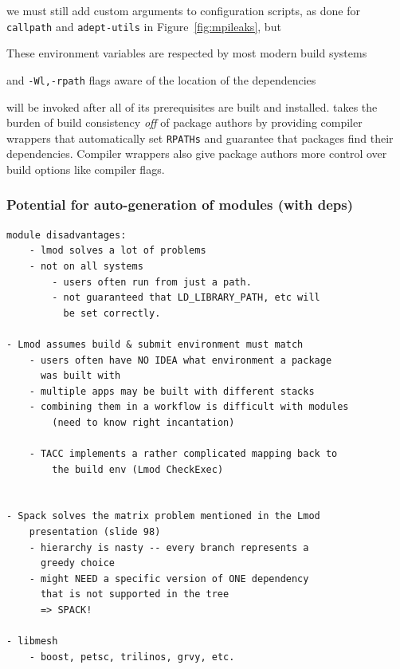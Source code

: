 we must still add custom arguments to configuration scripts, as done for
{\tt callpath} and {\tt adept-utils} in Figure~\ref{fig:mpileaks}, but 

These environment
variables are respected by most modern build systems


 and {\tt -Wl,-rpath} flags 
aware of the location of the dependencies 



 will be invoked
after all of its prerequisites are built and installed.  takes the burden of
build consistency {\it off} of package authors by providing compiler 
wrappers that automatically set {\tt RPATHs} and guarantee that packages
find their dependencies.  Compiler wrappers also give package authors
more control over build options like compiler flags.


\subsubsection{Potential for auto-generation of modules (with deps)}



\begin{verbatim}
module disadvantages:
	- lmod solves a lot of problems
	- not on all systems
		- users often run from just a path.
		- not guaranteed that LD_LIBRARY_PATH, etc will
		  be set correctly.

- Lmod assumes build & submit environment must match
	- users often have NO IDEA what environment a package
	  was built with
	- multiple apps may be built with different stacks
	- combining them in a workflow is difficult with modules
		(need to know right incantation)

	- TACC implements a rather complicated mapping back to
	    the build env (Lmod CheckExec)
	

- Spack solves the matrix problem mentioned in the Lmod
    presentation (slide 98)
	- hierarchy is nasty -- every branch represents a
	  greedy choice
	- might NEED a specific version of ONE dependency
	  that is not supported in the tree
	  => SPACK!

- libmesh
	- boost, petsc, trilinos, grvy, etc.
\end{verbatim}

